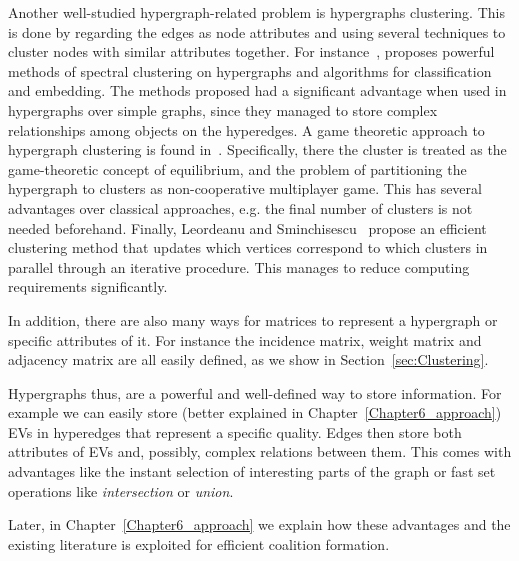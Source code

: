 Another well-studied hypergraph-related problem is hypergraphs clustering. This is done by regarding the edges as node attributes and using several techniques to cluster nodes with similar attributes together. For instance~\cite{zhou2006learning}, proposes powerful methods of spectral clustering on hypergraphs and algorithms for classification and embedding. The methods proposed had a significant advantage when used in hypergraphs over simple graphs, since they managed to store complex relationships among objects on the hyperedges. A game theoretic approach to hypergraph clustering is found in~\cite{bulo2009game}. Specifically, there the cluster is treated as the game-theoretic concept of equilibrium, and the problem of partitioning the hypergraph to clusters as non-cooperative multiplayer game. This has several advantages over classical approaches, e.g. the final number of clusters is not needed beforehand. Finally, Leordeanu and Sminchisescu~\cite{leordeanu2012efficient} propose an efficient clustering method that updates which vertices correspond to which clusters in parallel through an iterative procedure. This manages to reduce computing requirements significantly.



In addition, there are also many ways for matrices to represent a hypergraph or specific attributes of it. For instance the incidence matrix, weight matrix and adjacency matrix are all easily defined, as we show in Section~\ref{sec:Clustering}.

Hypergraphs thus, are a powerful and well-defined way to store information. For example we can easily store (better explained in Chapter~\ref{Chapter6_approach}) EVs in hyperedges that represent a specific quality. Edges then store both attributes of EVs and, possibly, complex relations between them. This comes with advantages like the instant selection of interesting parts of the graph or fast set operations like {\em intersection} or {\em union}.

Later, in Chapter~\ref{Chapter6_approach} we explain how these advantages and the existing literature is exploited for efficient coalition formation.





